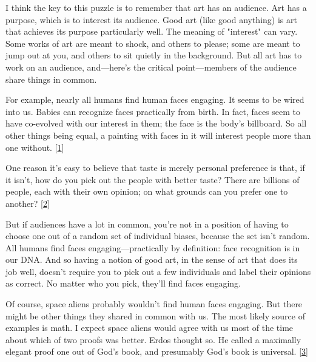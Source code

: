 I think the key to
                  this puzzle is to remember that art has an audience. Art has a
                  purpose, which is to interest its audience. Good art (like
                  good anything) is art that achieves its purpose particularly
                  well. The meaning of "interest" can vary. Some works of art
                  are meant to shock, and others to please; some are meant to
                  jump out at you, and others to sit quietly in the background.
                  But all art has to work on an audience, and---here's the
                  critical point---members of the audience share things in
                  common.

For example, nearly all humans find human
                  faces engaging. It seems to be wired into us. Babies can
                  recognize faces practically from birth. In fact, faces seem to
                  have co-evolved with our interest in them; the face is the
                  body's billboard. So all other things being equal, a painting
                  with faces in it will interest people more than one without.
                  [\href{\#f1n}{1}]

One reason it's easy to believe that taste is
                  merely personal preference is that, if it isn't, how do you
                  pick out the people with better taste? There are billions of
                  people, each with their own opinion; on what grounds can you
                  prefer one to another?
                  [\href{\#f2n}{2}]

But if audiences have a lot in common, you're not
                  in a position of having to choose one out of a random set of
                  individual biases, because the set isn't random. All humans
                  find faces engaging---practically by definition: face
                  recognition is in our DNA. And so having a notion of good art,
                  in the sense of art that does its job well, doesn't require
                  you to pick out a few individuals and label their opinions as
                  correct. No matter who you pick, they'll find faces
                  engaging.

Of course, space aliens probably wouldn't
                  find human faces engaging. But there might be other things
                  they shared in common with us. The most likely source of
                  examples is math. I expect space aliens would agree with us
                  most of the time about which of two proofs was better. Erdos
                  thought so. He called a maximally elegant proof one out of
                  God's book, and presumably God's book is universal.
                  [\href{\#f3n}{3}]

